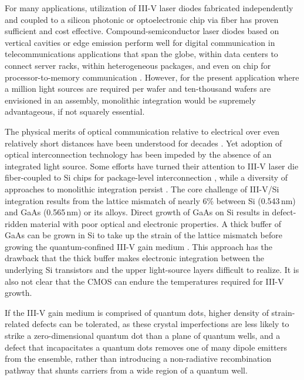 \documentclass[twocolumn]{article}
\begin{document}
For many applications, utilization of III-V laser diodes fabricated independently and coupled to a silicon photonic or optoelectronic chip via fiber has proven sufficient and cost effective. Compound-semiconductor laser diodes based on vertical cavities or edge emission perform well for digital communication in telecommunications applications that span the globe, within data centers to connect server racks, within heterogeneous packages, and even on chip for processor-to-memory communication \cite{suwa2015}. However, for the present application where a million light sources are required per wafer and ten-thousand wafers are envisioned in an assembly, monolithic integration would be supremely advantageous, if not squarely essential. 

The physical merits of optical communication relative to electrical over even relatively short distances have been understood for decades \cite{gole1984,mi1989,mi2000}. Yet adoption of optical interconnection technology has been impeded by the absence of an integrated light source. Some efforts have turned their attention to III-V laser die fiber-coupled to Si chips for package-level interconnection \cite{suwa2015}, while a diversity of approaches to monolithic integration persist \cite{crsa2017,zhha2018,huli2019,szha2019,haxu2021}. The core challenge of III-V/Si integration results from the lattice mismatch of nearly 6\% between Si (0.543\,nm) and GaAs (0.565\,nm) or its alloys. Direct growth of GaAs on Si results in defect-ridden material with poor optical and electronic properties. A thick buffer of GaAs can be grown in Si to take up the strain of the lattice mismatch before growing the quantum-confined III-V gain medium \cite{chli2016}. This approach has the drawback that the thick buffer makes electronic integration between the underlying Si transistors and the upper light-source layers difficult to realize. It is also not clear that the CMOS can endure the temperatures required for III-V growth. 

If the III-V gain medium is comprised of quantum dots, higher density of strain-related defects can be tolerated, as these crystal imperfections are less likely to strike a zero-dimensional quantum dot than a plane of quantum wells, and a defect that incapacitates a quantum dots removes one of many dipole emitters from the ensemble, rather than introducing a non-radiative recombination pathway that shunts carriers from a wide region of a quantum well. 
\end{document}
